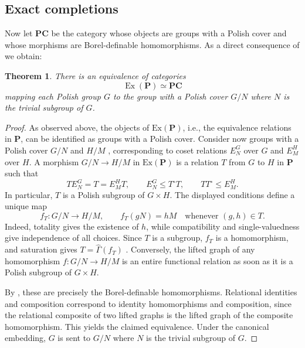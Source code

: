 \documentclass[12pt]{amsart}
\newtheorem{theorem}{Theorem}[section]
\theoremstyle{definition}
\newcommand{\func}[1]{\operatorname{#1}}
\begin{document}
\subsection{Exact completions}

Now let $\mathbf{PC}$ be the category whose objects are groups with a Polish
cover and whose morphisms are Borel-definable homomorphisms. As a direct
consequence of  we obtain:

\begin{theorem}
\label{thm:main-completion} There is an equivalence of categories 
\begin{equation*}
\func{Ex}(\mathbf{P})\simeq \mathbf{PC}
\end{equation*}%
mapping each Polish group $G$ to the group with a Polish cover $G/N$ where $%
N $ is the trivial subgroup of $G$.
\end{theorem}

\begin{proof}
As observed above, the objects of $\mathrm{Ex}\left( \mathbf{P}\right) $,
i.e., the equivalence relations in $\mathbf{P}$, can be identified as groups
with a Polish cover. Consider now groups with a Polish cover $G/N$ and $H/M$%
, corresponding to coset relations ${E}_{N}^{G}$ over $G$ and $E_{M}^{H}$
over $H$. A morphism $G/N\rightarrow H/M$ in $\mathrm{Ex}\left( \mathbf{P}%
\right) $ is a relation $T$ from $G$ to $H$ in $\mathbf{P}$ such that 
\begin{equation*}
TE_{N}^{G}=T=E_{M}^{H}T,\qquad E_{N}^{G}\leq T^{\circ }T,\qquad TT^{\circ
}\leq E_{M}^{H}.
\end{equation*}%
In particular, $T$ is a Polish subgroup of $G\times H$. The displayed
conditions define a unique map 
\begin{equation*}
f_{T}:G/N\longrightarrow H/M,\qquad f_{T}(gN)=hM\quad\text{whenever }%
(g,h)\in T.
\end{equation*}%
Indeed, totality gives the existence of $h$, while compatibility and
single-valuedness give independence of all choices. Since $T$ is a subgroup, 
$f_{T}$ is a homomorphism, and saturation gives $T=\widehat{\Gamma }(f_{T})$%
. Conversely, the lifted graph of any homomorphism $f:G/N\rightarrow H/M$ is
an entire functional relation as soon as it is a Polish subgroup of $G\times
H$.

By , these are precisely the Borel-definable
homomorphisms. Relational identities and composition correspond to identity
homomorphisms and composition, since the relational composite of two lifted
graphs is the lifted graph of the composite homomorphism. This yields the
claimed equivalence. Under the canonical embedding, $G$ is sent to $G/N$
where $N$ is the trivial subgroup of $G$.
\end{proof}
\end{document}
